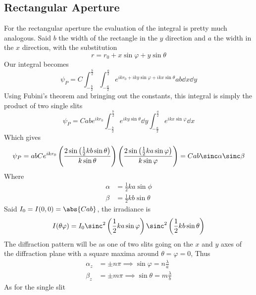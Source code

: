 \documentclass[../electromagnetism.tex]{subfiles}
\begin{document}
\subsection{Rectangular Aperture}
For the rectangular aperture the evaluation of the integral is pretty much analogous. Said $b$ the width of the rectangle in the $y$ direction and $a$ the width in the $x$ direction, with the substitution
\begin{equation*}
	r=r_0+x\sin\varphi+y\sin\theta
\end{equation*}
Our integral becomes
\begin{equation}
	\psi_P=C\int_{-\frac{b}{2}}^{\frac{b}{2}}\int_{-\frac{a}{2}}^{\frac{a}{2}}e^{ikr_0+iky\sin\varphi+ikx\sin\theta}ab\dd^{}{x}\dd^{}{y}
	\label{eq:squareapertureint.fradiff}
\end{equation}
Using Fubini's theorem and bringing out the constants, this integral is simply the product of two single slits
\begin{equation}
	\psi_P=Cabe^{ikr_0}\int_{-\frac{b}{2}}^{\frac{b}{2}}e^{iky\sin\theta}\dd^{}{y}\int_{-\frac{a}{2}}^{\frac{a}{2}}e^{ikx\sin\varphi}\dd^{}{x}
	\label{eq:doubleslitprod.fradiff}
\end{equation}
Which gives
\begin{equation}
	\psi_P=abCe^{ikr_0}\left( \frac{2\sin\left( \frac{1}{2}kb\sin\theta \right)}{k\sin\theta} \right)\left( \frac{2\sin\left( \frac{1}{2}ka\sin\varphi \right)}{k\sin\varphi} \right)=Cab\sinc\alpha\sinc\beta
	\label{eq:squareslit.fradiff}
\end{equation}
Where
\begin{equation*}
	\begin{aligned}
		\alpha&=\frac{1}{2}ka\sin\phi\\
		\beta&=\frac{1}{2}kb\sin\theta
	\end{aligned}
\end{equation*}
Said $I_0=I(0, 0)=\abs{Cab}$, the irradiance is
\begin{equation}
	I(\theta\varphi)=I_0\sinc^2\left( \frac{1}{2}ka\sin\varphi \right)\sinc^2\left( \frac{1}{2}kb\sin\theta \right)
	\label{eq:irradiancesquare.fradiff}
\end{equation}
The diffraction pattern will be as one of two slits going on the $x$ and $y$ axes of the diffraction plane with a square maxima around $\theta=\varphi=0$, Thus
\begin{equation}
	\begin{aligned}
		\alpha_z&=\pm n\pi\implies\sin\varphi=n\frac{\lambda}{a}\\
		\beta_z&=\pm m\pi\implies\sin\theta=m\frac{\lambda}{b}
	\end{aligned}
	\label{eq:zeroessquare.fradiff}
\end{equation}
As for the single slit
\end{document}
